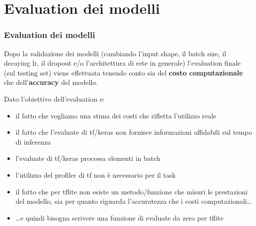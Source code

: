 \documentclass{beamer}
\newcommand{\dflvspace}{\vspace{10pt}}
\begin{document}
\section{Evaluation dei modelli}
\begin{frame}
    \frametitle{Evaluation dei modelli}
    
    Dopo la validazione dei modelli (cambiando l'input shape, il batch size, 
    il decaying lr, il dropout e/o l'architettura di rete in generale) l'evaluation finale
    (sul testing set) viene effettuata tenendo conto sia del \textbf{costo computazionale} che 
    dell'\textbf{accuracy} del modello.
    
    \dflvspace
    
    Dato l'obiettivo dell'evaluation e:
    \begin{itemize}
    		\item il fatto che vogliamo una stima dei costi che rifletta l'utilizzo reale
    		\item il fatto che l'evaluate di tf/keras non fornisce informazioni affidabili sul tempo di inferenza
    		\item l'evaluate di tf/keras processa elementi in batch
    		\item l'utilizzo del profiler di tf non è necessario per il task
    		\item il fatto che per tflite non esiste un metodo/funzione che misuri le prestazioni del modello,
    		sia per quanto riguarda l'accuratezza che i costi computazionali\dots
    		\item \dots e quindi bisogna scrivere una funzione di evaluate da zero per tflite
	\end{itemize}
\end{frame}
\end{document}
